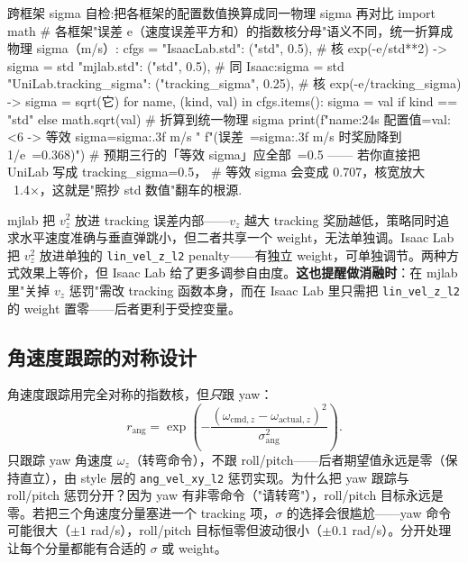 \begin{codebox}[Python]{跨框架 sigma 自检:把各框架的配置数值换算成同一物理 sigma 再对比}
import math
# 各框架"误差 e（速度误差平方和）的指数核分母"语义不同，统一折算成物理 sigma（m/s）:
cfgs = {
    "IsaacLab.std":        ("std",            0.5),    # 核 exp(-e/std**2)  -> sigma = std
    "mjlab.std":           ("std",            0.5),    # 同 Isaac:sigma = std
    "UniLab.tracking_sigma": ("tracking_sigma", 0.25), # 核 exp(-e/tracking_sigma) -> sigma = sqrt(它)
}
for name, (kind, val) in cfgs.items():
    sigma = val if kind == "std" else math.sqrt(val)   # 折算到统一物理 sigma
    print(f"{name:24s} 配置值={val:<6} -> 等效 sigma={sigma:.3f} m/s "
          f"(误差~={sigma:.3f} m/s 时奖励降到 1/e~=0.368)")
# 预期三行的「等效 sigma」应全部~=0.5 —— 若你直接把 UniLab 写成 tracking_sigma=0.5，
#   等效 sigma 会变成 0.707，核宽放大 ~1.4×，这就是"照抄 std 数值"翻车的根源.
\end{codebox}

\begin{insight}\label{ins:rlmc-rew-vzplace}
mjlab 把 $v_z^2$ 放进 tracking 误差内部——$v_z$ 越大 tracking 奖励越低，策略同时追求水平速度准确与垂直弹跳小，但二者共享一个 weight，无法单独调。Isaac Lab 把 $v_z^2$ 放进单独的 \verb|lin_vel_z_l2| penalty——有独立 weight，可单独调节。两种方式效果上等价，但 Isaac Lab 给了更多调参自由度。\textbf{这也提醒做消融时}：在 mjlab 里"关掉 $v_z$ 惩罚"需改 tracking 函数本身，而在 Isaac Lab 里只需把 \verb|lin_vel_z_l2| 的 weight 置零——后者更利于受控变量。
\end{insight}

\subsection{角速度跟踪的对称设计}
\label{sec:rlmc-rew-angtrack}

角速度跟踪用完全对称的指数核，但\emph{只}跟 yaw：
\begin{equation}
r_{\text{ang}}=\exp\!\left(-\frac{(\omega_{\text{cmd},z}-\omega_{\text{actual},z})^2}{\sigma_{\text{ang}}^2}\right).
\label{eq:rlmc-rew-angexp}
\end{equation}
只跟踪 yaw 角速度 $\omega_z$（转弯命令），不跟 roll/pitch——后者期望值永远是零（保持直立），由 style 层的 \verb|ang_vel_xy_l2| 惩罚实现。为什么把 yaw 跟踪与 roll/pitch 惩罚分开？因为 yaw 有非零命令（"请转弯"），roll/pitch 目标永远是零。若把三个角速度分量塞进一个 tracking 项，$\sigma$ 的选择会很尴尬——yaw 命令可能很大（$\pm1$ rad/s），roll/pitch 目标恒零但波动很小（$\pm0.1$ rad/s）。分开处理让每个分量都能有合适的 $\sigma$ 或 weight。


